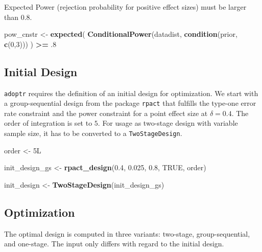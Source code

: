 \documentclass[]{book}
\newenvironment{Shaded}{\begin{snugshade}}{\end{snugshade}}
\newcommand{\DecValTok}[1]{\textcolor[rgb]{0.00,0.00,0.81}{#1}}
\newcommand{\FloatTok}[1]{\textcolor[rgb]{0.00,0.00,0.81}{#1}}
\newcommand{\KeywordTok}[1]{\textcolor[rgb]{0.13,0.29,0.53}{\textbf{#1}}}
\newcommand{\NormalTok}[1]{#1}
\newcommand{\OperatorTok}[1]{\textcolor[rgb]{0.81,0.36,0.00}{\textbf{#1}}}
\newcommand{\OtherTok}[1]{\textcolor[rgb]{0.56,0.35,0.01}{#1}}
\newcommand{\StringTok}[1]{\textcolor[rgb]{0.31,0.60,0.02}{#1}}
\begin{document}
Expected Power (rejection probability for positive effect sizes)
must be larger than \(0.8\).

\begin{Shaded}
\begin{Highlighting}[]
\NormalTok{pow_cnstr <-}\StringTok{ }\KeywordTok{expected}\NormalTok{(}
    \KeywordTok{ConditionalPower}\NormalTok{(datadist, }\KeywordTok{condition}\NormalTok{(prior, }\KeywordTok{c}\NormalTok{(}\DecValTok{0}\NormalTok{,}\DecValTok{3}\NormalTok{)))}
\NormalTok{    ) }\OperatorTok{>=}\StringTok{ }\FloatTok{.8}
\end{Highlighting}
\end{Shaded}

\hypertarget{initial-design-3}{%
\subsection{Initial Design}\label{initial-design-3}}

\texttt{adoptr} requires the definition of an initial design for optimization.
We start with a group-sequential design from the package \texttt{rpact} that
fulfills the type-one error rate constraint and the power
constraint for a point effect size at \(\delta = 0.4\).
The order of integration is set to \(5\).
For usage as two-stage design with variable sample size, it has to
be converted to a \texttt{TwoStageDesign}.

\begin{Shaded}
\begin{Highlighting}[]
\NormalTok{order <-}\StringTok{ }\NormalTok{5L }

\NormalTok{init_design_gs <-}\StringTok{ }\KeywordTok{rpact_design}\NormalTok{(}\FloatTok{0.4}\NormalTok{, }\FloatTok{0.025}\NormalTok{, }\FloatTok{0.8}\NormalTok{, }\OtherTok{TRUE}\NormalTok{, order)}

\NormalTok{init_design    <-}\StringTok{ }\KeywordTok{TwoStageDesign}\NormalTok{(init_design_gs)}
\end{Highlighting}
\end{Shaded}

\hypertarget{optimization-3}{%
\subsection{Optimization}\label{optimization-3}}

The optimal design is computed in three variants: two-stage,
group-sequential, and one-stage.
The input only differs with regard to the initial design.
\end{document}
